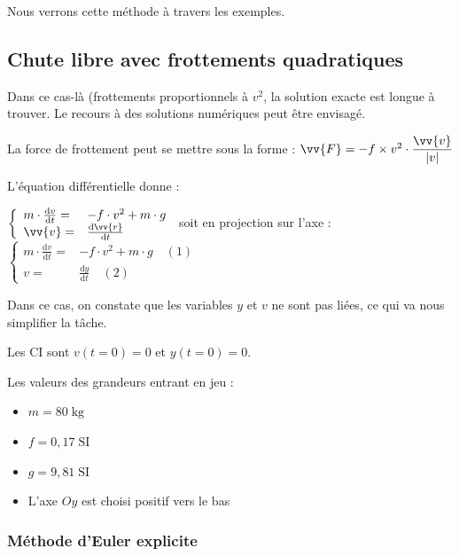 \documentclass[11pt]{article}
\begin{document}
Nous verrons cette méthode à travers les exemples.










\subsection{Chute libre avec frottements quadratiques}

Dans ce cas-là (frottements proportionnels à $v^2$, la solution exacte est longue à trouver. Le recours à des solutions numériques peut être envisagé.

La force de frottement peut se mettre sous la forme : $\vv{F} = -f\times v^2\cdot \dfrac{\vv{v}}{|v|}$ 


L'équation différentielle donne : 

$\left\{\begin{array}{ll}
 m\cdot \frac{\text{d}{v}}{\text{d}t} =& -f\cdot {v}^2+m\cdot{g}\\
 
 \vv{v} =& \frac{\text{d}\vv{r}}{\text{d}t}
 
\end{array}\right.$ soit en projection sur l'axe : 
$\left\{\begin{array}{ll}
 m\cdot \frac{\text{d}{v}}{\text{d}t} =& -f\cdot {v}^2+m\cdot {g}\quad (1)\\
 
 {v} =& \frac{\text{d}{y}}{\text{d}t} \quad (2)
 
\end{array}\right.$

Dans ce cas, on constate que les variables $y$ et $v$ ne sont pas liées, ce qui va nous simplifier la tâche.

Les CI sont $v(t = 0) = 0$ et $y(t = 0) = 0$.

\smallskip
Les valeurs des grandeurs entrant en jeu : 
\begin{itemize}
 \item $m = 80\;\text{kg}$
 \item $f = 0,17 \;\text{SI}$
 \item $g = 9,81\;\text{SI}$
 \item L'axe $Oy$ est choisi positif vers le bas
\end{itemize}



\medskip

\subsubsection{Méthode d'Euler explicite}
\end{document}
